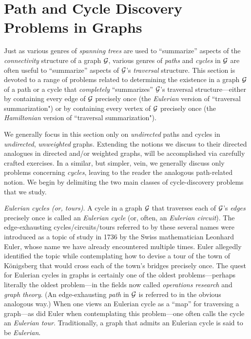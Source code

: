 \section{Path and Cycle Discovery Problems in Graphs}
\label{sec:path-cycle-problems}

Just as various genres of {\it spanning trees} are used to ``summarize'' aspects of the {\em connectivity} structure of a  graph $\mbox{$\cal G$}$, various genres of {\it paths} and {\it cycles} in $\mbox{$\cal G$}$ are often useful to ``summarize'' aspects of $\mbox{$\cal G$}$'s {\em traversal} structure.  This section is devoted to a range of problems related to determining the existence in a graph $\mbox{$\cal G$}$ of a path or a cycle that {\em completely} ``summarizes'' $\mbox{$\cal G$}$'s traversal structure---either by containing every edge of $\mbox{$\cal G$}$ precisely once (the {\it Eulerian} version of ``traversal summarization") or by containing every vertex of $\mbox{$\cal G$}$ precisely once (the {\it Hamiltonian} version of ``traversal summarization").

We generally focus in this section only on {\em undirected} paths and cycles in {\em undirected}, {\em unweighted} graphs.  Extending the notions we discuss to their directed analogues in directed and/or weighted graphs, will be accomplished via carefully crafted exercises.  In a similar, but simpler, vein, we generally discuss only problems concerning {\em cycles}, leaving to the reader the analogous path-related notion.  We begin by delimiting the two main classes of cycle-discovery problems that we study.

\bigskip

 
   

{\it Eulerian cycles (or, tours)}.
A cycle in a graph $\mbox{$\cal G$}$ that traverses each of $\mbox{$\cal G$}$'s {\em edges} precisely once is called an {\it Eulerian cycle} (or, often, an {\it Eulerian circuit}).  The edge-exhausting cycles/circuits/tours referred to by these several names were introduced as a topic of study in 1736 by the Swiss mathematician Leonhard Euler, whose name we have already encountered multiple times.  Euler allegedly identified the topic while contemplating how to devise a tour of the town of K\"{o}nigsberg that would cross each of the town's bridges precisely once.  The quest for Eulerian cycles in graphs is certainly one of the oldest problems---perhaps literally the oldest problem---in the fields now called {\it operations research} and {\it graph theory}.  (An edge-exhausting {\em path} in $\mbox{$\cal G$}$ is referred to in the obvious analogous way.)  When one views an Eulerian cycle as a ``map'' for traversing a graph---as did Euler when contemplating this problem---one often calls the cycle an {\it Eulerian tour}.  Traditionally, a graph that admits an Eulerian cycle is said to be {\it Eulerian}. 
     

